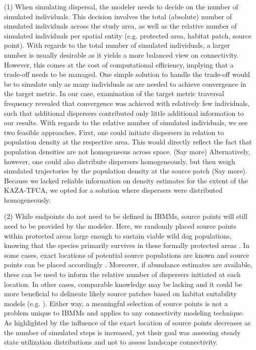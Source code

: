 \documentclass[abstract=on,10pt,a4paper,bibliography=totocnumbered]{article}
\begin{document}
(1) When simulating dispersal, the modeler needs to decide on the number of
simulated individuals. This decision involves the total (absolute) number of
simulated individuals across the study area, as well as the relative number of
simulated individuals per spatial entity (e.g. protected area, habitat patch,
source point). With regards to the total number of simulated individuals, a
larger number is usually desirable as it yields a more balanced view on
connectivity. However, this comes at the cost of computational efficiency,
implying that a trade-off needs to be managed. One simple solution to handle the
trade-off would be to simulate only as many individuals as are needed to achieve
convergence in the target metric. In our case, examination of the target metric
\textsf{traversal frequency} revealed that convergence was achieved with
relatively few individuals, such that additional dispersers contributed only
little additional information to our results. With regards to the relative
number of simulated individuals, we see two feasible approaches. First, one
could initiate dispersers in relation to population density at the respective
area. This would directly reflect the fact that population densities are not
homogeneous across space. (Say more) Alternatively, however, one could also
distribute dispersers homogeneously, but then weigh simulated trajectories by
the population density at the source patch (Say more). Because we lacked
reliable information on density estimates for the extent of the KAZA-TFCA, we
opted for a solution where dispersers were distributed homogeneously.

(2) While endpoints do not need to be defined in IBMMs, source points will still
need to be provided by the modeler. Here, we randomly placed source points
within protected areas large enough to sustain viable wild dog populations,
knowing that the species primarily survives in these formally protected areas
\citep{Woodroffe.1999, DaviesMostert.2012, Woodroffe.2012, VanDerMeer.2014}. In
some cases, exact locations of potential source populations are known and source
points can be placed accordingly \citep{Kanagaraj.2013}. Moreover, if abundance
estimates are available, these can be used to inform the relative number of
dispersers initiated at each location. In other cases, comparable knowledge may
be lacking and it could be more beneficial to delineate likely source patches
based on habitat suitability models (e.g. \citealp{Squires.2013}). Either way, a
meaningful selection of source points is not a problem unique to IBMMs and
applies to any connectivity modeling technique. As highlighted by
\cite{Signer.2017} the influence of the exact location of source points
decreases as the number of simulated steps is increased, yet their goal was
assessing steady state utilization distributions and not to assess landscape
connectivity.
\end{document}
